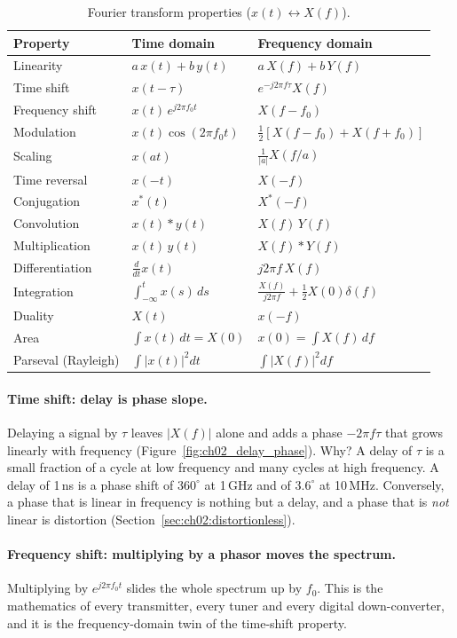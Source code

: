 \begin{table}[htbp]\centering\small
\caption{Fourier transform properties ($x(t)\leftrightarrow X(f)$).}\label{tab:ch02:props}
\begin{tabular}{@{}lll@{}}
\toprule
Property & Time domain & Frequency domain\\
\midrule
Linearity & $a\,x(t)+b\,y(t)$ & $a\,X(f)+b\,Y(f)$\\
Time shift & $x(t-\tau)$ & $e^{-j2\pi f\tau}X(f)$\\
Frequency shift & $x(t)\,e^{j2\pi f_0 t}$ & $X(f-f_0)$\\
Modulation & $x(t)\cos(2\pi f_0 t)$ & $\tfrac12[X(f-f_0)+X(f+f_0)]$\\
Scaling & $x(at)$ & $\frac{1}{|a|}X(f/a)$\\
Time reversal & $x(-t)$ & $X(-f)$\\
Conjugation & $x^*(t)$ & $X^*(-f)$\\
Convolution & $x(t)*y(t)$ & $X(f)\,Y(f)$\\
Multiplication & $x(t)\,y(t)$ & $X(f)*Y(f)$\\
Differentiation & $\frac{d}{dt}x(t)$ & $j2\pi f\,X(f)$\\
Integration & $\int_{-\infty}^{t}x(s)\,ds$ & $\frac{X(f)}{j2\pi f}+\frac12X(0)\delta(f)$\\
Duality & $X(t)$ & $x(-f)$\\
Area & $\int x(t)\,dt=X(0)$ & $x(0)=\int X(f)\,df$\\
Parseval (Rayleigh) & $\int|x(t)|^2dt$ & $\int|X(f)|^2df$\\
\bottomrule
\end{tabular}
\end{table}

\paragraph{Time shift: delay is phase slope.} Delaying a signal by $\tau$ leaves $|X(f)|$ alone
and adds a phase $-2\pi f\tau$ that grows linearly with frequency (Figure~\ref{fig:ch02_delay_phase}).
Why? A delay of $\tau$ is a small fraction of a cycle at low frequency and many cycles at high
frequency. A delay of 1\,ns is a phase shift of $360^\circ$ at 1\,GHz and of $3.6^\circ$ at 10\,MHz.
Conversely, a phase that is linear in frequency is nothing but a delay, and a phase that is
\emph{not} linear is distortion (Section~\ref{sec:ch02:distortionless}).

\paragraph{Frequency shift: multiplying by a phasor moves the spectrum.} Multiplying by
$e^{j2\pi f_0t}$ slides the whole spectrum up by $f_0$. This is the mathematics of every
transmitter, every tuner and every digital down-converter, and it is the frequency-domain twin of
the time-shift property.

